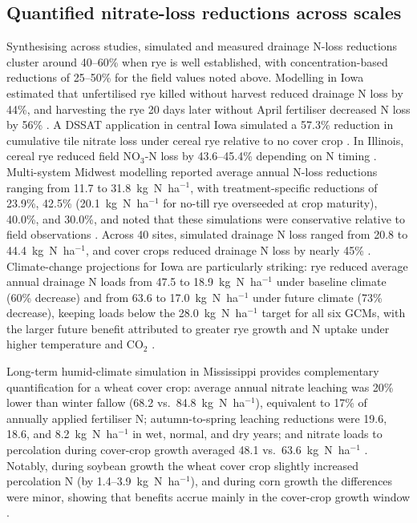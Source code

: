 \documentclass[11pt]{article}
\begin{document}
\subsection{Quantified nitrate-loss reductions across scales}
Synthesising across studies, simulated and measured drainage N-loss reductions cluster around 40--60\% when rye is well established, with concentration-based reductions of 25--50\% for the field values noted above. Modelling in Iowa estimated that unfertilised rye killed without harvest reduced drainage N loss by 44\%, and harvesting the rye 20 days later without April fertiliser decreased N loss by 56\% \parencite{Malone2018}. A DSSAT application in central Iowa simulated a 57.3\% reduction in cumulative tile nitrate loss under cereal rye relative to no cover crop \parencite{Chatterjee2025}. In Illinois, cereal rye reduced field NO$_3$-N loss by 43.6--45.4\% depending on N timing \parencite{Gupta2022}. Multi-system Midwest modelling reported average annual N-loss reductions ranging from 11.7 to 31.8~kg~N~ha$^{-1}$, with treatment-specific reductions of 23.9\%, 42.5\% (20.1~kg~N~ha$^{-1}$ for no-till rye overseeded at crop maturity), 40.0\%, and 30.0\%, and noted that these simulations were conservative relative to field observations \parencite{Malone2014b}. Across 40 sites, simulated drainage N loss ranged from 20.8 to 44.4~kg~N~ha$^{-1}$, and cover crops reduced drainage N loss by nearly 45\% \parencite{Malone2023}. Climate-change projections for Iowa are particularly striking: rye reduced average annual drainage N loads from 47.5 to 18.9~kg~N~ha$^{-1}$ under baseline climate (60\% decrease) and from 63.6 to 17.0~kg~N~ha$^{-1}$ under future climate (73\% decrease), keeping loads below the 28.0~kg~N~ha$^{-1}$ target for all six GCMs, with the larger future benefit attributed to greater rye growth and N uptake under higher temperature and CO$_2$ \parencite{Malone2020}.

Long-term humid-climate simulation in Mississippi provides complementary quantification for a wheat cover crop: average annual nitrate leaching was 20\% lower than winter fallow (68.2 vs.\ 84.8~kg~N~ha$^{-1}$), equivalent to 17\% of annually applied fertiliser N; autumn-to-spring leaching reductions were 19.6, 18.6, and 8.2~kg~N~ha$^{-1}$ in wet, normal, and dry years; and nitrate loads to percolation during cover-crop growth averaged 48.1 vs.\ 63.6~kg~N~ha$^{-1}$ \parencite{Yang2021}. Notably, during soybean growth the wheat cover crop slightly increased percolation N (by 1.4--3.9~kg~N~ha$^{-1}$), and during corn growth the differences were minor, showing that benefits accrue mainly in the cover-crop growth window \parencite{Yang2021}.
\end{document}
